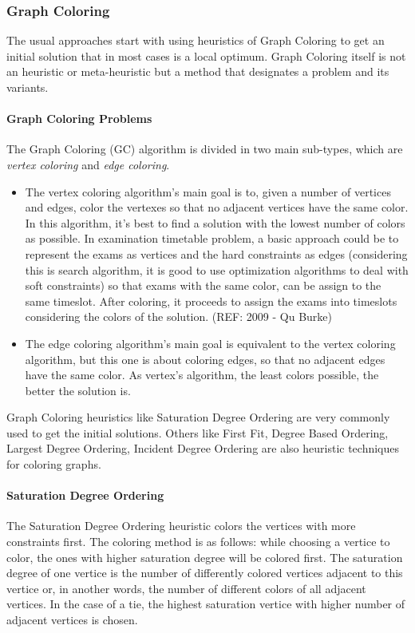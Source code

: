 \subsubsection{Graph Coloring}
The usual approaches start with using heuristics of Graph Coloring to get an initial solution that in most cases is a local optimum. Graph Coloring itself is not an heuristic or meta-heuristic but a method that designates a problem and its variants.\\

\paragraph{Graph Coloring Problems}
The Graph Coloring (GC) algorithm is divided in two main sub-types, which are \textit{vertex coloring} and \textit{edge coloring}.
\begin{itemize}
  \item The vertex coloring algorithm's main goal is to, given a number of vertices and edges, color the vertexes so that no adjacent vertices have the same color. In this algorithm, it's best to find a solution with the lowest number of colors as possible. In examination timetable problem, a basic approach could be to represent the exams as vertices and the hard constraints as edges (considering this is search algorithm, it is good to use optimization algorithms to deal with soft constraints) so that exams with the same color, can be assign to the same timeslot. After coloring, it proceeds to assign the exams into timeslots considering the colors of the solution. (REF: 2009 - Qu Burke)
  \item The edge coloring algorithm's main goal is equivalent to the vertex coloring algorithm, but this one is about coloring edges, so that no adjacent edges have the same color. As vertex's algorithm, the least colors possible, the better the solution is.
\end{itemize}

Graph Coloring heuristics like Saturation Degree Ordering are very commonly used to get the initial solutions. Others like First Fit, Degree Based Ordering, Largest Degree Ordering, Incident Degree Ordering are also heuristic techniques for coloring graphs.\\

\paragraph{Saturation Degree Ordering}
The Saturation Degree Ordering heuristic colors the vertices with more constraints first. The coloring method is as follows: while choosing a vertice to color, the ones with higher saturation degree will be colored first. The saturation degree of one vertice is the number of differently colored vertices adjacent to this vertice or, in another words, the number of different colors of all adjacent vertices. In the case of a tie, the highest saturation vertice with higher number of adjacent vertices is chosen.

